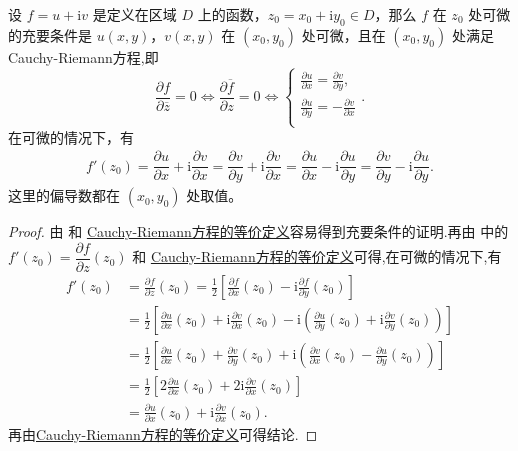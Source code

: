 \documentclass[../../main.tex]{subfiles}%
\begin{document}
\begin{theorem}\label{theorem:复变函数可微的充要条件2}
设 \( f = u + \mathrm{i}v \) 是定义在区域 \( D \) 上的函数，\( z_0 = x_0 + \mathrm{i}y_0 \in D \)，那么 \( f \) 在 \( z_0 \) 处可微的充要条件是 \( u(x, y) \)，\( v(x, y) \) 在 \( (x_0, y_0) \) 处可微，且在 \( (x_0, y_0) \) 处满足Cauchy-Riemann方程,即
\[
\frac{\partial f}{\partial \overline{z}}=0\Longleftrightarrow \frac{\partial \overline{f}}{\partial z}=0\Longleftrightarrow \begin{cases}
\frac{\partial u}{\partial x}=\frac{\partial v}{\partial y},\\
\frac{\partial u}{\partial y}=-\frac{\partial v}{\partial x}\\
\end{cases}.
\]
在可微的情况下，有
\begin{align*}
f'(z_0) = \dfrac{\partial u}{\partial x} + \mathrm{i}\dfrac{\partial v}{\partial x}
= \dfrac{\partial v}{\partial y} + \mathrm{i}\dfrac{\partial v}{\partial x} = \dfrac{\partial u}{\partial x} - \mathrm{i}\dfrac{\partial u}{\partial y} = \dfrac{\partial v}{\partial y} - \mathrm{i}\dfrac{\partial u}{\partial y}.
\end{align*}
这里的偏导数都在 \( (x_0, y_0) \) 处取值。
\end{theorem}
\begin{proof}

由  和 \hyperref[theorem:Cauchy-Riemann方程的等价定义]{Cauchy-Riemann方程的等价定义}容易得到充要条件的证明.再由 中的\( f'(z_0) = \dfrac{\partial f}{\partial z}(z_0) \) 和 \hyperref[theorem:Cauchy-Riemann方程的等价定义]{Cauchy-Riemann方程的等价定义}可得,在可微的情况下,有
\begin{align*}
f' (z_0)&=\frac{\partial f}{\partial z}(z_0)=\frac{1}{2}\left[ \frac{\partial f}{\partial x}(z_0)-\mathrm{i}\frac{\partial f}{\partial y}(z_0) \right] 
\\
&=\frac{1}{2}\left[ \frac{\partial u}{\partial x}(z_0)+\mathrm{i}\frac{\partial v}{\partial x}(z_0)-\mathrm{i}\left( \frac{\partial u}{\partial y}(z_0)+\mathrm{i}\frac{\partial v}{\partial y}(z_0) \right) \right] 
\\
&=\frac{1}{2}\left[ \frac{\partial u}{\partial x}(z_0)+\frac{\partial v}{\partial y}(z_0)+\mathrm{i}\left( \frac{\partial v}{\partial x}(z_0)-\frac{\partial u}{\partial y}(z_0) \right) \right] 
\\
&=\frac{1}{2}\left[ 2\frac{\partial u}{\partial x}(z_0)+2\mathrm{i}\frac{\partial v}{\partial x}(z_0) \right] 
\\
&=\frac{\partial u}{\partial x}(z_0)+\mathrm{i}\frac{\partial v}{\partial x}(z_0).
\end{align*}
再由\hyperref[theorem:Cauchy-Riemann方程的等价定义]{Cauchy-Riemann方程的等价定义}可得结论.

\end{proof}
\end{document}
